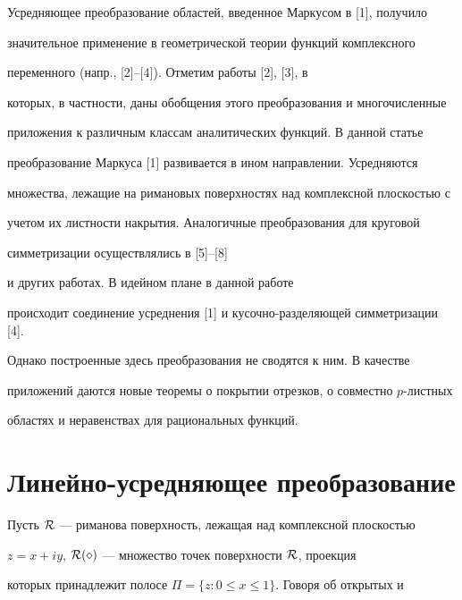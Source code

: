 \maketitle


\label{begin}





Усредняющее преобразование областей, введенное Маркусом в [1], получило


значительное применение в геометрической теории функций комплексного


переменного (напр., [2]--[4]). Отметим работы [2], [3], в


которых, в частности, даны обобщения этого преобразования и многочисленные


приложения к различным классам аналитических функций. В данной статье


преобразование Маркуса [1] развивается в ином направлении. Усредняются


множества, лежащие на римановых поверхностях над комплексной плоскостью с


учетом их листности накрытия. Аналогичные преобразования для круговой


симметризации осуществлялись в [5]--[8]


и других работах. В идейном плане в данной работе


происходит соединение усреднения [1] и кусочно-разделяющей симметризации [4].


Однако построенные здесь преобразования не сводятся к ним. В качестве


приложений даются новые теоремы о покрытии отрезков, о совместно $p$-листных


областях и неравенствах для рациональных функций.





\section{Линейно-усредняющее преобразование}





Пусть $\cal R$ --- риманова поверхность, лежащая над комплексной плоскостью


$z=x+iy$, $\cal R (\Pi)$ --- множество точек поверхности $\cal R$, проекция


которых принадлежит полосе $\Pi=\{z: 0\le x\le 1\}$. Говоря об открытых и


